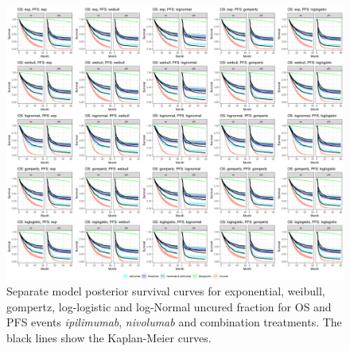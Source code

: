 \documentclass[AMA,STIX1COL]{WileyNJD-v2}
\begin{document}

\begin{figure}
\centering
\includegraphics[width=0.9\linewidth]{plot_S_grid_cf_separate.png}
\caption{\label{fig:S_grid_separate} Separate model posterior survival curves for exponential, weibull, gompertz, log-logistic and log-Normal uncured fraction for OS and PFS events {\it ipilimumab}, {\it nivolumab} and combination treatments. The black lines show the Kaplan-Meier curves.}
\end{figure}

\end{document}
